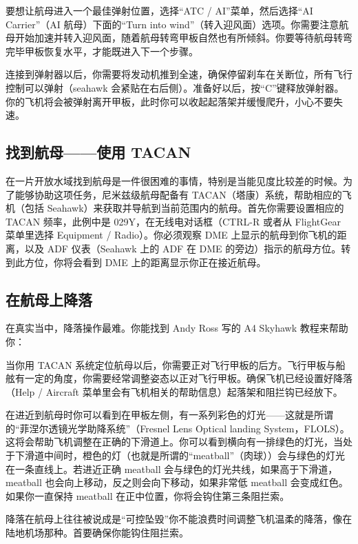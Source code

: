 要想让航母进入一个最佳弹射位置，选择“ATC / AI”菜单，然后选择“AI Carrier”（AI 航母）下面的“Turn into wind”（转入迎风面）选项。你需要注意航母开始加速并转入迎风面，随着航母转弯甲板自然也有所倾斜。你要等待航母转弯完毕甲板恢复水平，才能既进入下一个步骤。

连接到弹射器以后，你需要将发动机推到全速，确保停留刹车在关断位，所有飞行控制可以弹射（seahawk 会紧贴在右后侧）。准备好以后，按“C”键释放弹射器。你的飞机将会被弹射离开甲板，此时你可以收起起落架并缓慢爬升，小心不要失速。

\subsection{找到航母——使用 TACAN}

在一片开放水域找到航母是一件很困难的事情，特别是当能见度比较差的时候。为了能够协助这项任务，尼米兹级航母配备有 TACAN（塔康）系统，帮助相应的飞机（包括 Seahawk）来获取并导航到当前范围内的航母。首先你需要设置相应的 TACAN 频率，此例中是 029Y，在无线电对话框（CTRL-R 或者从 FlightGear 菜单里选择 Equipment / Radio）。你必须观察 DME 上显示的航母到你飞机的距离，以及 ADF 仪表（Seahawk 上的 ADF 在 DME 的旁边）指示的航母方位。转到此方位，你将会看到 DME 上的距离显示你正在接近航母。

\subsection{在航母上降落}

在真实当中，降落操作最难。你能找到 Andy Ross 写的 A4 Skyhawk 教程来帮助你：

\noindent
{}

当你用 TACAN 系统定位航母以后，你需要正对飞行甲板的后方。飞行甲板与船舷有一定的角度，你需要经常调整姿态以正对飞行甲板。确保飞机已经设置好降落（Help / Aircraft 菜单里会有飞机相关的帮助信息）起落架和阻拦钩已经放下。

在进近到航母时你可以看到在甲板左侧，有一系列彩色的灯光——这就是所谓的“菲涅尔透镜光学助降系统”（Fresnel Lens Optical landing System，FLOLS）。这将会帮助飞机调整在正确的下滑道上。你可以看到横向有一排绿色的灯光，当处于下滑道中间时，橙色的灯（也就是所谓的“meatball”（肉球））会与绿色的灯光在一条直线上。若进近正确 meatball 会与绿色的灯光共线，如果高于下滑道，meatball 也会向上移动，反之则会向下移动，如果非常低 meatball 会变成红色。如果你一直保持 meatball 在正中位置，你将会钩住第三条阻拦索。

降落在航母上往往被说成是“可控坠毁”你不能浪费时间调整飞机温柔的降落，像在陆地机场那种。首要确保你能钩住阻拦索。

